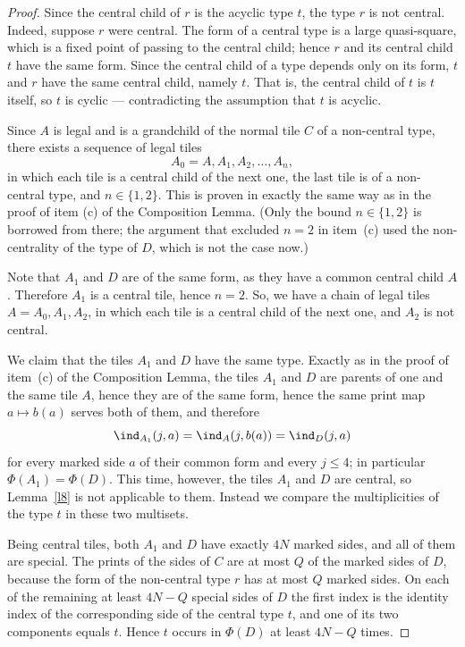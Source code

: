 \documentclass[12pt]{article}
\theoremstyle{remark}
\begin{document}
\begin{proof}
Since the central child of $r$ is the acyclic type $t$,
the type $r$ is not central. Indeed, suppose $r$ were central. The form of a central type is a large quasi-square,
which is a fixed point of passing to the central child; hence $r$ and its central child $t$ have the same form.
Since the central child of a type depends only on its form, $t$ and $r$ have the same central child, namely $t$.
That is, the central child of $t$ is $t$ itself, so $t$ is cyclic --- contradicting the assumption that $t$ is acyclic.

Since $A$ is legal and is a grandchild of the normal tile $C$ of a non-central type, there exists a sequence of legal tiles
$$
A_0=A,A_1,A_2,\dots,A_n,
$$
in which each tile is a central child of the next one, the last tile is of a non-central type, and $n\in\{1,2\}$.
This is proven in exactly the same way as in the proof of item (c) of the Composition Lemma. (Only
the bound $n\in\{1,2\}$ is borrowed from there; the argument that excluded $n=2$ in item~(c) used
the non-centrality of the type of $D$, which is not the case now.)


Note that $A_1$ and $D$
are of the same form, as they have a common
central child $A$. Therefore $A_1$ is a central tile, hence $n=2$.
So, we have a chain of legal tiles $A=A_0,A_1,A_2$, in which each tile is a central child of the next one,
and $A_2$ is not central.

We claim that the tiles $A_1$ and $D$ have the same type. Exactly as in the proof of item~(c) of
the Composition Lemma, the tiles $A_1$ and $D$ are parents of one and the same tile $A$, hence
they are of the same form, hence the same print map $a\mapsto b(a)$ serves both of them, and
therefore
$$
\ind_{A_1}(j,a)=\ind_A(j,b(a))=\ind_D(j,a)
$$
for every marked side $a$ of their common form and every $j\le4$; in particular
$\Phi(A_1)=\Phi(D)$. This time, however, the tiles $A_1$ and $D$ are central, so
Lemma~\ref{l8} is not applicable to them. Instead we compare the multiplicities
of the type $t$ in these two multisets.

Being central tiles, both $A_1$ and $D$ have exactly $4N$ marked sides, and all of them are
special. The prints of the sides of $C$ are at most $Q$ of the marked sides of $D$, because the
form of the non-central type $r$ has at most $Q$ marked sides. On each of the remaining at least
$4N-Q$ special sides of $D$ the first index is the identity index of the corresponding side of the
central type $t$, and one of its two components equals $t$. Hence $t$ occurs in $\Phi(D)$ at least
$4N-Q$ times.


\end{proof}
\end{document}
